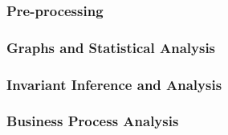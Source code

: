 \subsubsection{Pre-processing}
\label{subsubsec:6_P3P4_preprocessing}

\subsubsection{Graphs and Statistical Analysis}
\label{subsubsec:6_P3P4_graphs}

\subsubsection{Invariant Inference and Analysis}
\label{subsubsec:6_P3P4_invariants}

\subsubsection{Business Process Analysis}
\label{subsubsec:6_P3P4_bpa}

\vfill
\nolinenumbers